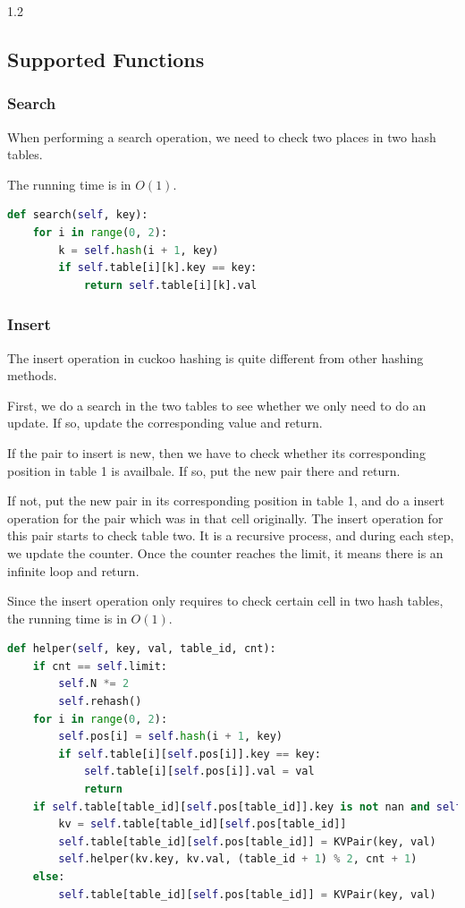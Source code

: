 \documentclass{article}
\begin{document}
\begin{spacing}{1.2}
\subsection{Supported Functions}
\subsubsection{Search}
When performing a search operation, we need to check two places in two hash tables.

The running time is in $O(1)$.
\begin{lstlisting}[language=Python]
def search(self, key):
    for i in range(0, 2):
        k = self.hash(i + 1, key)
        if self.table[i][k].key == key:
            return self.table[i][k].val
\end{lstlisting}

\subsubsection{Insert}
The insert operation in cuckoo hashing is quite different from other hashing methods.

First, we do a search in the two tables to see whether we only need to do an update. If so, update the corresponding value and return.

If the pair to insert is new, then we have to check whether its corresponding position in table 1 is availbale. If so, put the new pair there and return.

If not, put the new pair in its corresponding position in table 1, and do a insert operation for the pair which was in that cell originally. The insert operation for this pair starts to check table two. It is a recursive process, and during each step, we update the counter. Once the counter reaches the limit, it means there is an infinite loop and return.

Since the insert operation only requires to check certain cell in two hash tables, the running time is in $O(1)$.
\begin{lstlisting}[language=Python]
def helper(self, key, val, table_id, cnt):
    if cnt == self.limit:
        self.N *= 2
        self.rehash()
    for i in range(0, 2):
        self.pos[i] = self.hash(i + 1, key)
        if self.table[i][self.pos[i]].key == key:
            self.table[i][self.pos[i]].val = val
            return
    if self.table[table_id][self.pos[table_id]].key is not nan and self.table[table_id][self.pos[table_id]].val is not nan:
        kv = self.table[table_id][self.pos[table_id]]
        self.table[table_id][self.pos[table_id]] = KVPair(key, val)
        self.helper(kv.key, kv.val, (table_id + 1) % 2, cnt + 1)
    else:
        self.table[table_id][self.pos[table_id]] = KVPair(key, val)


\end{lstlisting}
\end{spacing}
\end{document}
